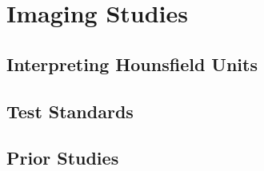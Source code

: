 \section{Imaging Studies\label{sec:literatureReview:imaging}}

\subsection{Interpreting Hounsfield Units\label{sec:literatureReview:imaging:HU}}

\subsection{Test Standards\label{sec:literatureReview:imaging:standards}}

\subsection{Prior Studies\label{sec:literatureReview:imaging:priorStudies}}
